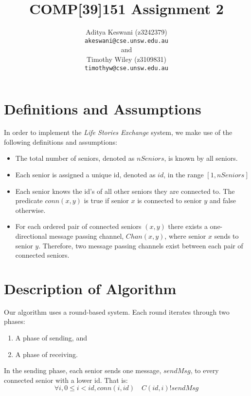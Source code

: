 \documentclass[12pt,a4paper]{scrartcl}
\begin{document}
\title{COMP[39]151 Assignment 2}
\author{Aditya Keswani (z3242379) \\ 
        \texttt{akeswani@cse.unsw.edu.au} \\ 
        and \\ 
        Timothy Wiley (z3109831) \\
        \texttt{timothyw@cse.unsw.edu.au} }

\maketitle

\section{Definitions and Assumptions}
In order to implement the \emph{Life Stories Exchange} system, we make use of the following definitions and assumptions:
\begin{itemize}
    \item The total number of seniors, denoted as $nSeniors$, is known by all seniors.
    \item Each senior is assigned a unique id, denoted as $id$, in the range $[1,nSeniors]$
    \item Each senior knows the id's of all other seniors they are connected to.
          The predicate $conn(x,y)$ is true if senior $x$ is connected to senior $y$ and false otherwise.
    \item For each ordered pair of connected seniors $(x,y)$ there exists a one-directional message passing channel, $Chan(x,y)$, where senior $x$ sends to senior $y$.
          Therefore, two message passing channels exist between each pair of connected seniors.
\end{itemize}

\section{Description of Algorithm}
Our algorithm uses a round-based system.
Each round iterates through two phases:
\begin{enumerate}
    \item A phase of sending, and
    \item A phase of receiving.
\end{enumerate}

In the sending phase, each senior sends one message, $sendMsg$, to every connected senior with a lower id.
That is:
\begin{equation}
    \forall i, 0 \le i < id, conn(i, id) \quad C(id,i)!sendMsg
\label{eq:send-phase}
\end{equation}
\end{document}

